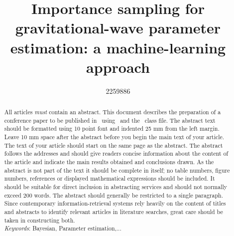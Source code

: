 \documentclass[a4paper]{jpconf}
\begin{document}
\title{Importance sampling for gravitational-wave parameter estimation: a machine-learning approach}

\author{2259886}

\address{SUPA, School of Physics and Astronomy, University of Glasgow, Glasgow G12 8QQ, United Kingdom}


\begin{abstract}
All articles {\it must} contain an abstract. This document describes the  preparation of a conference paper to be published in \jpcs\ using \LaTeXe\ and the \cls\ class file. The abstract text should be formatted using 10 point font and indented 25 mm from the left margin. Leave 10 mm space after the abstract before you begin the main text of your article. The text of your article should start on the same page as the abstract. The abstract follows the addresses and should give readers concise information about the content of the article and indicate the main results obtained and conclusions drawn. As the abstract is not part of the text it should be complete in itself; no table numbers, figure numbers, references or displayed mathematical expressions should be included. It should be suitable for direct inclusion in abstracting services and should not normally exceed 200 words. The abstract should generally be restricted to a single paragraph. Since contemporary information-retrieval systems rely heavily on the content of titles and abstracts to identify relevant articles in literature searches, great care should be taken in constructing both.\\
\textit{Keywords}: Bayesian, Parameter estimation,...

\end{abstract}
\end{document}
